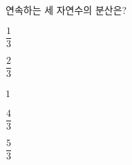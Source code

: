 연속하는 세 자연수의 분산은?
\begin{choices32}{\rule[-3ex]{0pt}{8ex}$\dfrac{1}{3}$}{\rule[-3ex]{0pt}{8ex}$\dfrac{2}{3}$}{\rule[-3ex]{0pt}{8ex}$1$}{\rule[-3ex]{0pt}{8ex}$\dfrac{4}{3}$}{\rule[-3ex]{0pt}{8ex}$\dfrac{5}{3}$}\end{choices32}
